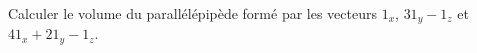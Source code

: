 
\begin{exercice}\label{exoOutilsMath-0073}

    Calculer le volume du parallélépipède formé par les vecteurs $1_x$, $31_y-1_z$ et $41_x+21_y-1_z$.

\end{exercice}
